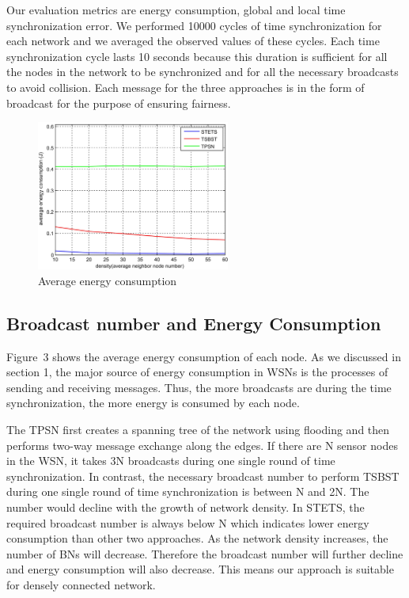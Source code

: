 \documentclass[runningheads,a4paper]{llncs}
\begin{document}
Our evaluation metrics are energy consumption, global and local time synchronization error. We performed 10000 cycles of time synchronization for each network and we averaged the observed values of these cycles. Each time synchronization cycle lasts 10 seconds because this duration is sufficient for all the nodes in the network to be synchronized and for all the necessary broadcasts to avoid collision. Each message for the three approaches is in the form of broadcast for the purpose of ensuring fairness.

\begin{figure}[!h]
\centering
\includegraphics[width=2.5in]{fig3.jpg}
\caption{Average energy consumption}
\label{fig_sim}
\end{figure}


\subsection{Broadcast number and Energy Consumption}
Figure~3 shows the average energy consumption of each node. As we discussed in section 1, the major source of energy consumption in WSNs is the processes of sending and receiving messages. Thus, the more broadcasts are during the time synchronization, the more energy is consumed by each node.

The TPSN first creates a spanning tree of the network using flooding and then performs two-way message exchange along the edges. If there are N sensor nodes in the WSN, it takes 3N broadcasts during one single round of time synchronization. In contrast, the necessary broadcast number to perform TSBST during one single round of time synchronization is between N and 2N. The number would decline with the growth of network density. In STETS, the required broadcast number is always below N which indicates lower energy consumption than other two approaches. As the network density increases, the number of BNs will decrease. Therefore the broadcast number will further decline and energy consumption will also decrease. This means our approach is suitable for densely connected network.
\end{document}
